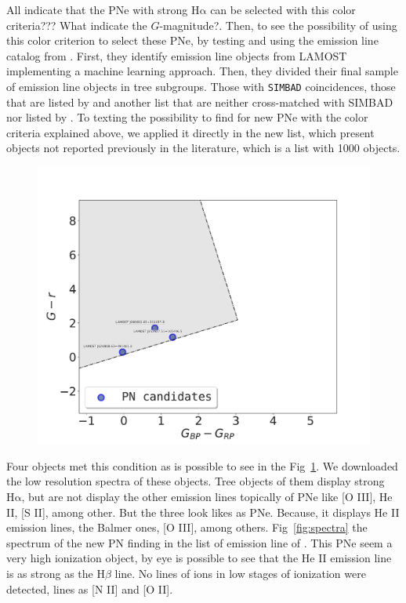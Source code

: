 \documentclass[twocolumn]{article}
\newcommand\ha{\ensuremath{\mathrm{H\alpha}}}
\begin{document}
All indicate that the PNe with strong \ha{} can be selected with this color criteria??? What indicate the $G$-magnitude?.
Then, to see the possibility of using this color criterion to select these PNe, by
testing and using the emission line catalog from  \citet{Skoda:2020}. First, they
identify emission line objects from LAMOST  implementing a machine learning approach.
Then, they divided their final sample of emission line objects in tree subgroups. Those with \texttt{SIMBAD}
coincidences, those that are listed by \citet{Hou:2016} and another list that are neither cross-matched with
SIMBAD nor listed by  \citet{Hou:2016}. To texting the possibility to find for new PNe with the color criteria
explained above, we applied it directly in the new list, which present objects not reported
previously in the literature, which is a list with 1000 objects.

\begin{figure}
\centering
  \includegraphics[width=0.9\linewidth]{../Figs/pn-candidates-gaiaDR3.pdf}
  \caption{} 
  \label{fig:gaia-ps-apply}
\end{figure}

Four objects met this condition as is possible to see in the Fig~\ref{fig:gaia-ps-apply}.
We downloaded the low resolution spectra of these objects. 
Tree objects of them display strong \ha{}, but are not display the other emission lines topically
of PNe like [O III], He II, [S II], among other. But the three look likes as PNe.
Because, it displays He II emission lines, the Balmer ones, [O III], among others.
Fig~\ref{fig:spectra} the spectrum of the new PN finding in the list of emission line of
\citet{Skoda:2020}. This PNe seem a very high ionization object, by eye is possible to see
that the He II emission line is as strong as the H$\beta$ line. No lines of ions in low stages
of ionization were detected, lines as [N II] and [O II].
\end{document}
